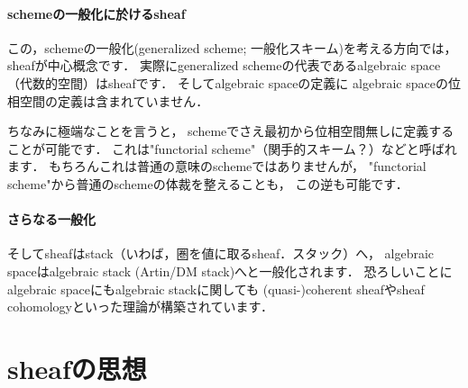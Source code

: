 \documentclass[]{jsarticle}
\begin{document}
    \paragraph{schemeの一般化に於けるsheaf}
    この，schemeの一般化(generalized scheme; 一般化スキーム)を考える方向では，
    sheafが中心概念です．
    実際にgeneralized schemeの代表であるalgebraic space（代数的空間）はsheafです．
    そしてalgebraic spaceの定義に
    algebraic spaceの位相空間の定義は含まれていません．
    
    ちなみに極端なことを言うと，
    schemeでさえ最初から位相空間無しに定義することが可能です．
    これは"functorial scheme"（関手的スキーム？）などと呼ばれます．
    もちろんこれは普通の意味のschemeではありませんが，
    "functorial scheme"から普通のschemeの体裁を整えることも，
    この逆も可能です．

    \paragraph{さらなる一般化}
    そしてsheafはstack（いわば，圏を値に取るsheaf．スタック）へ，
    algebraic spaceはalgebraic stack (Artin/DM stack)へと一般化されます．
    恐ろしいことにalgebraic spaceにもalgebraic stackに関しても
    (quasi-)coherent sheafやsheaf cohomologyといった理論が構築されています．

\section{sheafの思想}
\end{document}
